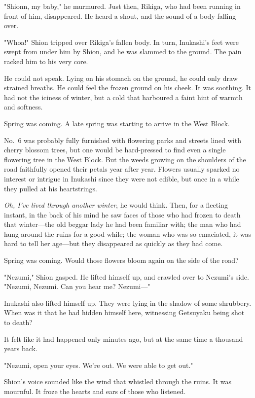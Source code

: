 "Shionn, my baby," he murmured. Just then, Rikiga, who had been running
in front of him, disappeared. He heard a shout, and the sound of a body
falling over.

"Whoa!" Shion tripped over Rikiga's fallen body. In turn, Inukashi's
feet were swept from under him by Shion, and he was slammed to the
ground. The pain racked him to his very core.

He could not speak. Lying on his stomach on the ground, he could only
draw strained breaths. He could feel the frozen ground on his cheek. It
was soothing. It had not the iciness of winter, but a cold that
harboured a faint hint of warmth and softness.

Spring was coming. A late spring was starting to arrive in the West
Block.

No.~6 was probably fully furnished with flowering parks and streets
lined with cherry blossom trees, but one would be hard-pressed to find
even a single flowering tree in the West Block. But the weeds growing on
the shoulders of the road faithfully opened their petals year after
year. Flowers usually sparked no interest or intrigue in Inukashi since
they were not edible, but once in a while they pulled at his
heartstrings.

\emph{Oh, I've lived through another winter}, he would think. Then, for a
fleeting instant, in the back of his mind he saw faces of those who had
frozen to death that winter---the old beggar lady he had been familiar
with; the man who had hung around the ruins for a good while; the woman
who was so emaciated, it was hard to tell her age---but they disappeared
as quickly as they had come.

Spring was coming. Would those flowers bloom again on the side of the
road?

"Nezumi," Shion gasped. He lifted himself up, and crawled over to
Nezumi's side. "Nezumi, Nezumi. Can you hear me? Nezumi---"

Inukashi also lifted himself up. They were lying in the shadow of some
shrubbery. When was it that he had hidden himself here, witnessing
Getsuyaku being shot to death?

It felt like it had happened only minutes ago, but at the same time a
thousand years back.

"Nezumi, open your eyes. We're out. We were able to get out."

Shion's voice sounded like the wind that whistled through the ruins. It
was mournful. It froze the hearts and ears of those who listened.

